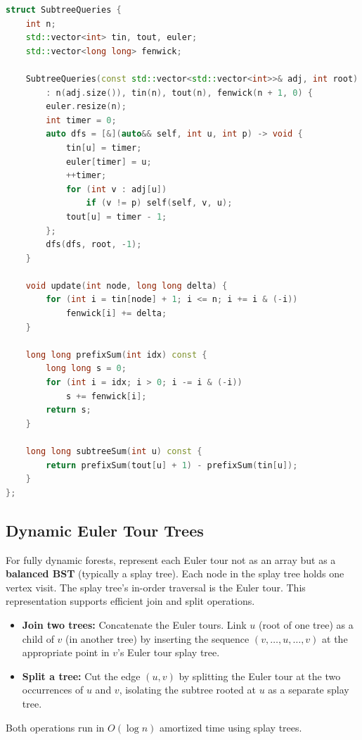 \begin{lstlisting}[language=C++]
struct SubtreeQueries {
    int n;
    std::vector<int> tin, tout, euler;
    std::vector<long long> fenwick;

    SubtreeQueries(const std::vector<std::vector<int>>& adj, int root)
        : n(adj.size()), tin(n), tout(n), fenwick(n + 1, 0) {
        euler.resize(n);
        int timer = 0;
        auto dfs = [&](auto&& self, int u, int p) -> void {
            tin[u] = timer;
            euler[timer] = u;
            ++timer;
            for (int v : adj[u])
                if (v != p) self(self, v, u);
            tout[u] = timer - 1;
        };
        dfs(dfs, root, -1);
    }

    void update(int node, long long delta) {
        for (int i = tin[node] + 1; i <= n; i += i & (-i))
            fenwick[i] += delta;
    }

    long long prefixSum(int idx) const {
        long long s = 0;
        for (int i = idx; i > 0; i -= i & (-i))
            s += fenwick[i];
        return s;
    }

    long long subtreeSum(int u) const {
        return prefixSum(tout[u] + 1) - prefixSum(tin[u]);
    }
};
\end{lstlisting}

\subsection{Dynamic Euler Tour Trees}

For fully dynamic forests, represent each Euler tour not as an array but as a \textbf{balanced BST} (typically a splay tree). Each node in the splay tree holds one vertex visit. The splay tree's in-order traversal is the Euler tour. This representation supports efficient join and split operations.

\begin{itemize}
\item \textbf{Join two trees:} Concatenate the Euler tours. Link $u$ (root of one tree) as a child of $v$ (in another tree) by inserting the sequence $(v, \ldots, u, \ldots, v)$ at the appropriate point in $v$'s Euler tour splay tree.
\item \textbf{Split a tree:} Cut the edge $(u, v)$ by splitting the Euler tour at the two occurrences of $u$ and $v$, isolating the subtree rooted at $u$ as a separate splay tree.
\end{itemize}

Both operations run in $O(\log n)$ amortized time using splay trees.

